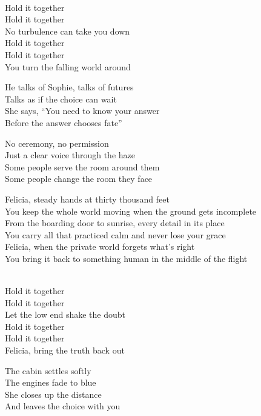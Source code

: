 \begin{lyrics}
\\
Hold it together\\
Hold it together\\
No turbulence can take you down\\
Hold it together\\
Hold it together\\
You turn the falling world around

He talks of Sophie, talks of futures\\
Talks as if the choice can wait\\
She says, “You need to know your answer\\
Before the answer chooses fate”

No ceremony, no permission\\
Just a clear voice through the haze\\
Some people serve the room around them\\
Some people change the room they face

Felicia, steady hands at thirty thousand feet\\
You keep the whole world moving when the ground gets incomplete\\
From the boarding door to sunrise, every detail in its place\\
You carry all that practiced calm and never lose your grace\\
Felicia, when the private world forgets what’s right\\
You bring it back to something human in the middle of the flight

\\
Hold it together\\
Hold it together\\
Let the low end shake the doubt\\
Hold it together\\
Hold it together\\
Felicia, bring the truth back out

The cabin settles softly\\
The engines fade to blue\\
She closes up the distance\\
And leaves the choice with you
\end{lyrics}

